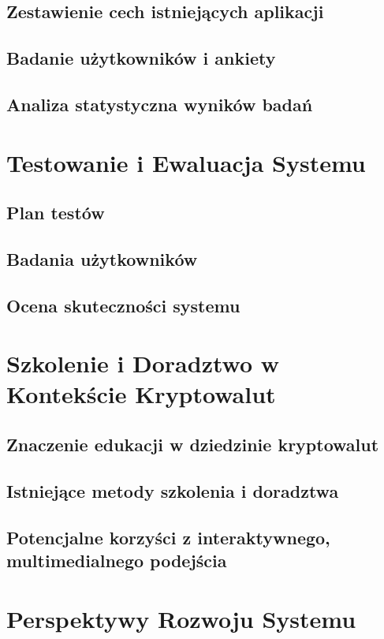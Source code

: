 \documentclass[12pt, a4paper, onside, polish]{article}				%
\begin{document}
\subsection{Zestawienie cech istniejących aplikacji}
\subsection{Badanie użytkowników i ankiety}
\subsection{Analiza statystyczna wyników badań}

\section{Testowanie i Ewaluacja Systemu}
\subsection{Plan testów}
\subsection{Badania użytkowników}
\subsection{Ocena skuteczności systemu}

\section{Szkolenie i Doradztwo w Kontekście Kryptowalut}
\subsection{Znaczenie edukacji w dziedzinie kryptowalut}
\subsection{Istniejące metody szkolenia i doradztwa}
\subsection{Potencjalne korzyści z interaktywnego, multimedialnego podejścia}

\section{Perspektywy Rozwoju Systemu}
\end{document}
